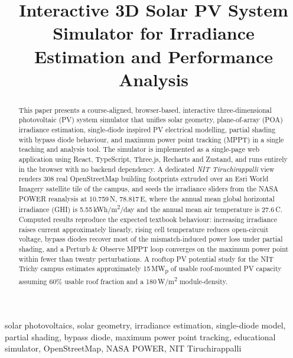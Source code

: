 \documentclass[conference]{IEEEtran}
\begin{document}
\title{Interactive 3D Solar PV System Simulator for Irradiance Estimation and Performance Analysis}

\author{
}

\maketitle

\begin{abstract}
This paper presents a course-aligned, browser-based, interactive three-dimensional photovoltaic (PV) system simulator that unifies solar geometry, plane-of-array (POA) irradiance estimation, single-diode inspired PV electrical modelling, partial shading with bypass diode behaviour, and maximum power point tracking (MPPT) in a single teaching and analysis tool. The simulator is implemented as a single-page web application using React, TypeScript, Three.js, Recharts and Zustand, and runs entirely in the browser with no backend dependency. A dedicated \emph{NIT Tiruchirappalli} view renders 308 real OpenStreetMap building footprints extruded over an Esri World Imagery satellite tile of the campus, and seeds the irradiance sliders from the NASA POWER reanalysis at 10.759\,\textdegree N, 78.817\,\textdegree E, where the annual mean global horizontal irradiance (GHI) is 5.55\,kWh/m\textsuperscript{2}/day and the annual mean air temperature is 27.6\,\textdegree C. Computed results reproduce the expected textbook behaviour: increasing irradiance raises current approximately linearly, rising cell temperature reduces open-circuit voltage, bypass diodes recover most of the mismatch-induced power loss under partial shading, and a Perturb \& Observe MPPT loop converges on the maximum power point within fewer than twenty perturbations. A rooftop PV potential study for the NIT Trichy campus estimates approximately 15\,MW\textsubscript{p} of usable roof-mounted PV capacity assuming 60\% usable roof fraction and a 180\,W/m\textsuperscript{2} module-density.
\end{abstract}

\begin{IEEEkeywords}
solar photovoltaics, solar geometry, irradiance estimation, single-diode model, partial shading, bypass diode, maximum power point tracking, educational simulator, OpenStreetMap, NASA POWER, NIT Tiruchirappalli
\end{IEEEkeywords}
\end{document}
